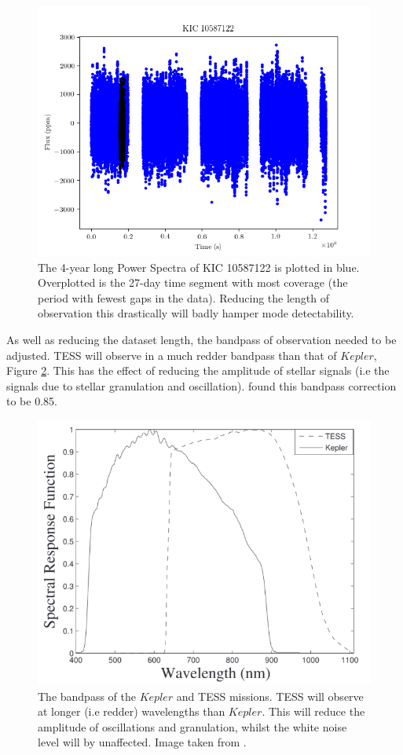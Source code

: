 \documentclass[a4paper,fleqn,usenatbib,useAMS]{mnras}
\newcommand{\kep}{\ensuremath{Kepler}\:}
\begin{document}
\begin{figure}
	\centering
	\includegraphics[scale=0.6]{timeseries_10587122}
	\caption{The 4-year long Power Spectra of KIC 10587122 is plotted in blue. Overplotted is the 27-day time segment with most coverage (the period with fewest gaps in the data). Reducing the length of observation this drastically will badly hamper mode detectability.}	
	\label{ts plot}
\end{figure} 

As well as reducing the dataset length, the bandpass of observation needed to be adjusted. TESS will observe in a much redder bandpass than that of \kep, Figure \ref{bandpass}. This has the effect of reducing the amplitude of stellar signals (i.e the signals due to stellar granulation and oscillation). \citet{campante_asteroseismic_2016} found this bandpass correction to be 0.85.

\begin{figure}
	\centering
	\includegraphics[scale=0.4]{bandpass.png}
	\caption{The bandpass of the $Kepler$ and TESS missions. TESS will observe at longer (i.e redder) wavelengths than $Kepler$. This will reduce the amplitude of oscillations and granulation, whilst the white noise level will by unaffected. Image taken from \citet{placek_combining_2016}.}	
	\label{bandpass}
\end{figure} 
\end{document}
